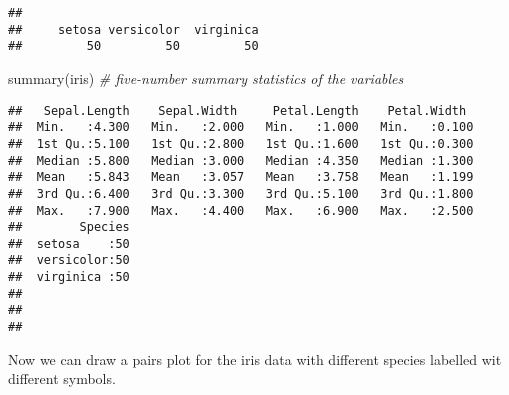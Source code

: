 \documentclass[
]{article}
\newenvironment{Shaded}{\begin{snugshade}}{\end{snugshade}}
\newcommand{\AttributeTok}[1]{\textcolor[rgb]{0.77,0.63,0.00}{#1}}
\newcommand{\CommentTok}[1]{\textcolor[rgb]{0.56,0.35,0.01}{\textit{#1}}}
\newcommand{\ConstantTok}[1]{\textcolor[rgb]{0.00,0.00,0.00}{#1}}
\newcommand{\DecValTok}[1]{\textcolor[rgb]{0.00,0.00,0.81}{#1}}
\newcommand{\FloatTok}[1]{\textcolor[rgb]{0.00,0.00,0.81}{#1}}
\newcommand{\FunctionTok}[1]{\textcolor[rgb]{0.00,0.00,0.00}{#1}}
\newcommand{\NormalTok}[1]{#1}
\newcommand{\OtherTok}[1]{\textcolor[rgb]{0.56,0.35,0.01}{#1}}
\newcommand{\SpecialCharTok}[1]{\textcolor[rgb]{0.00,0.00,0.00}{#1}}
\newcommand{\StringTok}[1]{\textcolor[rgb]{0.31,0.60,0.02}{#1}}
\begin{document}
\begin{verbatim}
## 
##     setosa versicolor  virginica 
##         50         50         50
\end{verbatim}

\begin{Shaded}
\begin{Highlighting}[]
\FunctionTok{summary}\NormalTok{(iris) }\CommentTok{\# five{-}number summary statistics of the variables}
\end{Highlighting}
\end{Shaded}

\begin{verbatim}
##   Sepal.Length    Sepal.Width     Petal.Length    Petal.Width   
##  Min.   :4.300   Min.   :2.000   Min.   :1.000   Min.   :0.100  
##  1st Qu.:5.100   1st Qu.:2.800   1st Qu.:1.600   1st Qu.:0.300  
##  Median :5.800   Median :3.000   Median :4.350   Median :1.300  
##  Mean   :5.843   Mean   :3.057   Mean   :3.758   Mean   :1.199  
##  3rd Qu.:6.400   3rd Qu.:3.300   3rd Qu.:5.100   3rd Qu.:1.800  
##  Max.   :7.900   Max.   :4.400   Max.   :6.900   Max.   :2.500  
##        Species  
##  setosa    :50  
##  versicolor:50  
##  virginica :50  
##                 
##                 
## 
\end{verbatim}

Now we can draw a pairs plot for the iris data with different species
labelled wit different symbols.

\begin{Shaded}
\end{Shaded}
\end{document}
